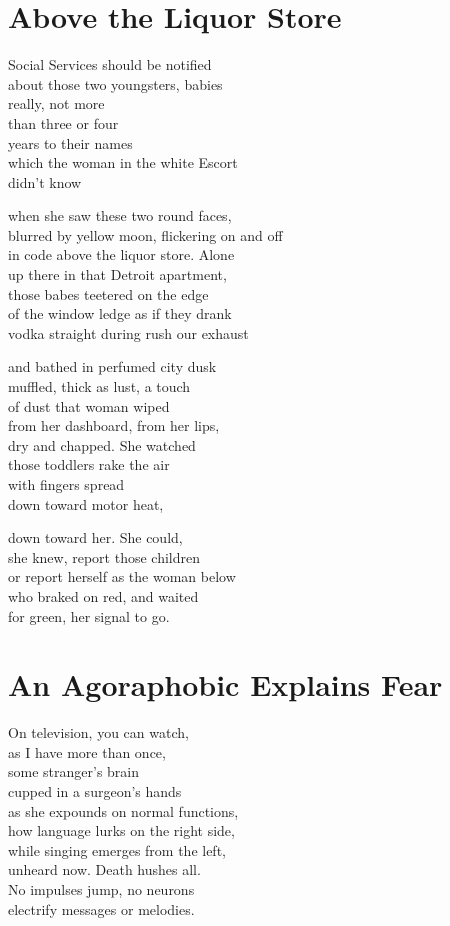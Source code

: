 \documentclass[twoside,10pt]{book}
\begin{document}
\clearpage
\section{Above the Liquor Store}

Social Services should be notified\\
about those two youngsters, babies\\
really, not more\\
than three or four\\
years to their names\\
which the woman in the white Escort\\
didn't know

when she saw these two round faces,\\
blurred by yellow moon, flickering on and off\\
in code above the liquor store. Alone\\
up there in that Detroit apartment,\\
those babes teetered on the edge\\
of the window ledge as if they drank\\
vodka straight during rush our exhaust

and bathed in perfumed city dusk\\
muffled, thick as lust, a touch\\
of dust that woman wiped\\
from her dashboard, from her lips,\\
dry and chapped. She watched\\
those toddlers rake the air\\
with fingers spread\\
down toward motor heat,

down toward her. She could,\\
she knew, report those children\\
or report herself as the woman below\\
who braked on red, and waited\\
for green, her signal to go.

\clearpage
\section{An Agoraphobic Explains Fear}

On television, you can watch,\\
as I have more than once,\\
some stranger's brain\\
cupped in a surgeon's hands\\
as she expounds on normal functions,\\
how language lurks on the right side,\\
while singing emerges from the left,\\
unheard now. Death hushes all.\\
No impulses jump, no neurons\\
electrify messages or melodies.
\end{document}

